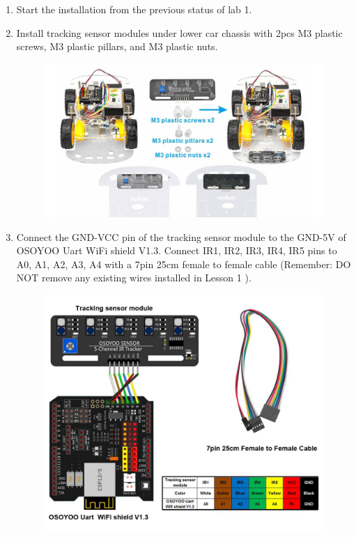\documentclass{article}
\begin{document}
	\begin{enumerate}
		\item Start the installation from the previous status of lab 1.
		
		\item Install tracking sensor modules under lower car chassis with 2pcs M3 plastic screws, M3 plastic pillars, and M3 plastic nuts.
		
		\begin{figure}[H]
			\centering
			\includegraphics[width=0.7\linewidth]{image2}
			\label{fig:image2}
		\end{figure}
		
		\item Connect the GND-VCC pin of the tracking sensor module to the GND-5V of OSOYOO Uart WiFi shield V1.3.  Connect IR1, IR2, IR3, IR4, IR5 pins to A0, A1, A2, A3, A4 with a 7pin 25cm female to female cable (Remember: DO NOT remove any existing wires installed in Lesson 1 ).
		
		\begin{figure}[H]
			\centering
			\includegraphics[width=0.7\linewidth]{image3}
			\label{fig:image3}
		\end{figure}
		
	\end{enumerate}
\end{document}
